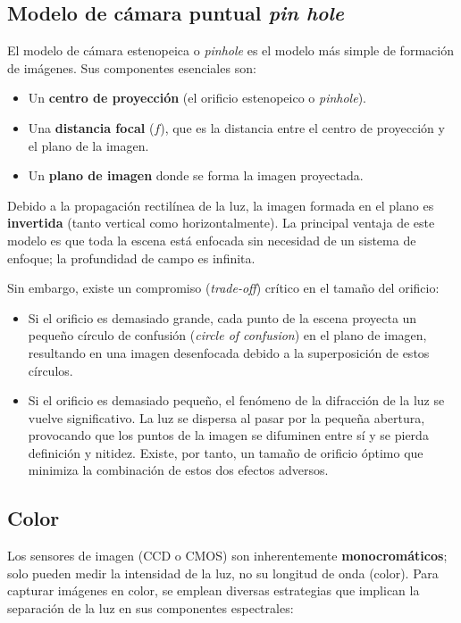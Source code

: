 \subsection{Modelo de cámara puntual \textit{pin hole}}
El modelo de cámara estenopeica o \textit{pinhole} es el modelo más simple de formación de imágenes. Sus componentes esenciales son:
\begin{itemize}
\item Un \textbf{centro de proyección} (el orificio estenopeico o \textit{pinhole}).
\item Una \textbf{distancia focal} ($f$), que es la distancia entre el centro de proyección y el plano de la imagen.
\item Un \textbf{plano de imagen} donde se forma la imagen proyectada.
\end{itemize}

Debido a la propagación rectilínea de la luz, la imagen formada en el plano es \textbf{invertida} (tanto vertical como horizontalmente). La principal ventaja de este modelo es que toda la escena está enfocada sin necesidad de un sistema de enfoque; la profundidad de campo es infinita.

Sin embargo, existe un compromiso (\textit{trade-off}) crítico en el tamaño del orificio:
\begin{itemize}
\item Si el orificio es demasiado grande, cada punto de la escena proyecta un pequeño círculo de confusión (\textit{circle of confusion}) en el plano de imagen, resultando en una imagen desenfocada debido a la superposición de estos círculos.
\item Si el orificio es demasiado pequeño, el fenómeno de la difracción de la luz se vuelve significativo. La luz se dispersa al pasar por la pequeña abertura, provocando que los puntos de la imagen se difuminen entre sí y se pierda definición y nitidez. Existe, por tanto, un tamaño de orificio óptimo que minimiza la combinación de estos dos efectos adversos.
\end{itemize}

\subsection{Color}
Los sensores de imagen (CCD o CMOS) son inherentemente \textbf{monocromáticos}; solo pueden medir la intensidad de la luz, no su longitud de onda (color). Para capturar imágenes en color, se emplean diversas estrategias que implican la separación de la luz en sus componentes espectrales:

